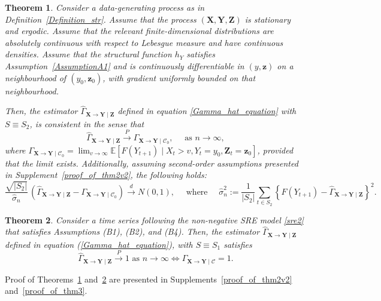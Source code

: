 \documentclass[a4paper,11pt]{article}
\newtheorem{theorem}{Theorem}
\begin{document}
\begin{theorem}\label{Theorem2v2}
Consider a data-generating process as in Definition~\ref{Definition_str}. 
Assume that the process \((\mathbf X,\mathbf Y,\mathbf Z)\) is stationary 
and ergodic. Assume that the relevant finite-dimensional distributions are 
absolutely continuous with respect to Lebesgue measure and have continuous 
densities.  Assume that the structural function \(h_Y\) satisfies 
Assumption~\ref{AssumptionA1} and is continuously differentiable in 
\((y,\mathbf z)\) on a neighbourhood of \((y_0,\mathbf z_0)\), with gradient 
uniformly bounded on that neighbourhood.

Then, the estimator \(\hat{\Gamma}_{\textbf{X}\to\textbf{Y}\mid \textbf{Z}}\) defined in equation \eqref{Gamma_hat_equation} with \(S \equiv S_2\),  is consistent in the sense that   \begin{equation*}
   \hat{\Gamma}_{\textbf{X}\to\textbf{Y}\mid \textbf{Z}} \overset{P}{\to} \Gamma_{\textbf{X}\to\textbf{Y}\mid\mathcal{C}_0}, \quad \text{ as }n\to\infty,
  \end{equation*}
where $\Gamma_{\textbf{X}\to\textbf{Y}\mid\mathcal{C}_0} = \lim_{v\to\infty} \mathbb{E}[ F(Y_{t+1})\mid X_t>v,Y_t = y_0, \textbf{Z}_t = \textbf{z}_0]$, provided that the limit exists. Additionally, assuming second-order assumptions presented in Supplement~\ref{proof_of_thm2v2}, the following holds:
\[
    \frac{\sqrt{|S_2|}}{\widehat\sigma_n}\,
    \left(
        \widehat\Gamma_{\mathbf X\to\mathbf Y\mid\mathbf Z}
        -
        \Gamma_{\mathbf X\to\mathbf Y\mid\mathcal C_0}
    \right)
    \overset{d}{\to} N(0,1), \quad \text{ where }\quad
        \widehat\sigma_n^2
    :=
    \frac1{|S_2|}
    \sum_{t\in S_2}
    \left\{
        F(Y_{t+1})
        -
        \widehat\Gamma_{\mathbf X\to\mathbf Y\mid\mathbf Z}
    \right\}^2.
\]
\end{theorem}

\begin{theorem}\label{Theorem3}
Consider a time series following the non-negative SRE model \eqref{sre2} that satisfies Assumptions (B1), (B2), and (B4). Then, the estimator \(\hat{\Gamma}_{\textbf{X}\to\textbf{Y}\mid \textbf{Z}}\) defined in equation (\ref{Gamma_hat_equation}), with \(S \equiv S_1\) satisfies
\begin{equation}
\label{consistency_theorem2}
\hat{\Gamma}_{\textbf{X}\to\textbf{Y}\mid\textbf{Z}} \overset{P}{\to} 1 \text{   as }n\to\infty\iff  \Gamma_{\textbf{X}\to\textbf{Y}\mid\mathcal{C}} = 1.
\end{equation}
\end{theorem}
Proof of Theorems~\ref{Theorem2v2} and~\ref{Theorem3} are presented in Supplements~\ref{proof_of_thm2v2} and~\ref{proof_of_thm3}. 
\end{document}
